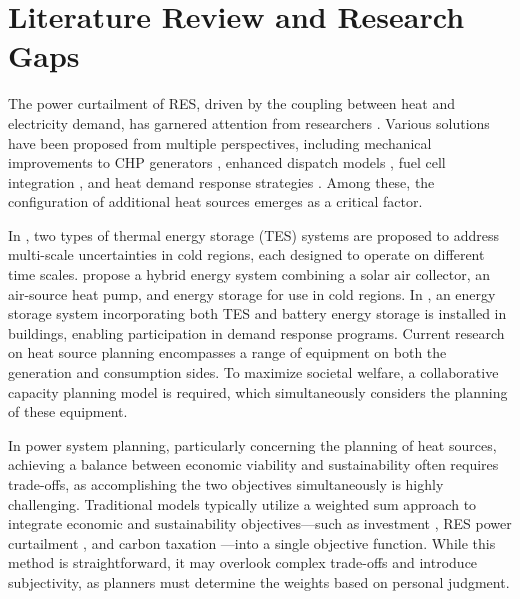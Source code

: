\section{Literature Review and Research Gaps}
The power curtailment of RES, driven by the coupling between heat and electricity demand, has garnered attention from researchers \cite{Ding_wind}. Various solutions have been proposed from multiple perspectives, including mechanical improvements to CHP generators \cite{9409901}, enhanced dispatch models \cite{9815530}, fuel cell integration \cite{9826833}, and heat demand response strategies \cite{10075469,yi2021improving}. Among these, the configuration of additional heat sources emerges as a critical factor.

In \cite{9990600}, two types of thermal energy storage (TES) systems are proposed to address multi-scale uncertainties in cold regions, each designed to operate on different time scales.
\citet{xu2020feasibility} propose a hybrid energy system combining a solar air collector, an air-source heat pump, and energy storage for use in cold regions. In \cite{9844159}, an energy storage system incorporating both TES and battery energy storage is installed in buildings, enabling participation in demand response programs.
Current research on heat source planning encompasses a range of equipment on both the generation and consumption sides. To maximize societal welfare, a collaborative capacity planning model is required, which simultaneously considers the planning of these equipment.

In power system planning, particularly concerning the planning of heat sources, achieving a balance between economic viability and sustainability often requires trade-offs, as accomplishing the two objectives simultaneously is highly challenging. Traditional models typically utilize a weighted sum approach to integrate economic and sustainability objectives—such as investment \cite{10102312,9822978,9920235}, RES power curtailment \cite{10102312}, and carbon taxation \cite{9822978}—into a single objective function. While this method is straightforward, it may overlook complex trade-offs and introduce subjectivity, as planners must determine the weights based on personal judgment.

